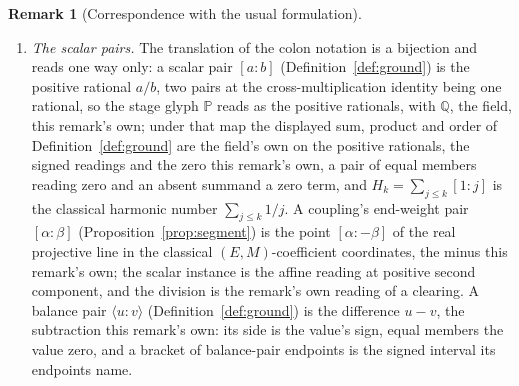 \documentclass[11pt]{article}
\theoremstyle{definition}
\newtheorem{remark}{Remark}
\begin{document}
\begin{remark}[Correspondence with the usual formulation]
\begin{enumerate}[leftmargin=2em,itemsep=3pt]
\item \emph{The scalar pairs.} The translation of the colon
notation is a bijection and reads one way only: a scalar pair
$[a\!:\!b]$ (Definition~\ref{def:ground}) is the positive
rational $a/b$, two pairs at the cross-multiplication
identity being one rational, so the stage glyph $\mathbb P$ reads
as the positive rationals, with $\mathbb Q$, the field, this
remark's own; under that map the displayed sum,
product and order of Definition~\ref{def:ground} are the field's
own on the positive rationals, the signed readings and the zero
this remark's own, a pair of equal members reading zero and an absent
summand a zero term, and
$H_k=\sum_{j\le k}[1\!:\!j]$ is the classical harmonic number
$\sum_{j\le k}1/j$. A coupling's end-weight pair $[\alpha\!:\!\beta]$
(Proposition~\ref{prop:segment}) is the point $[\alpha:-\beta]$ of the
real projective line in the classical $(E,M)$-coefficient
coordinates, the minus this remark's own; the scalar instance is the
affine reading at positive second component, and the division is the
remark's own reading of a clearing. A balance pair
$\langle u\!:\!v\rangle$ (Definition~\ref{def:ground}) is the
difference $u-v$, the subtraction this remark's own: its side is the
value's sign, equal members the value zero, and a bracket of
balance-pair endpoints is the signed interval its endpoints name.


\end{enumerate}
\end{remark}
\end{document}
